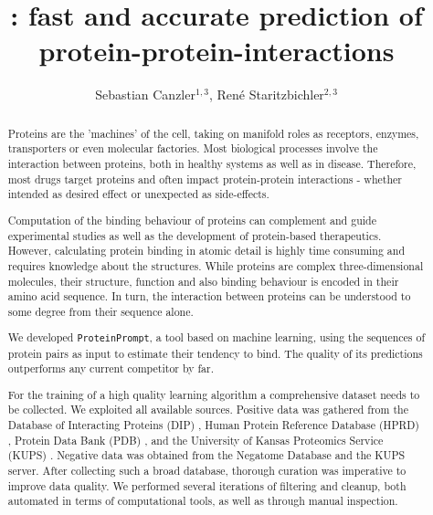 \documentclass{article}
\title{\tool: fast and accurate prediction of protein-protein-interactions}
\author{ Sebastian Canzler$^{1,3}$, Ren\'{e} Staritzbichler$^{2,3}$}
\date{}
\newcommand{\tool}{\texttt{ProteinPrompt}}
\begin{document}
\maketitle

\vspace{-1.cm}









\begin{samepage}

\begin{abstract}
  Proteins are the 'machines' of the cell, taking on manifold roles as receptors, enzymes, transporters or even molecular factories.
  Most biological processes involve the interaction between proteins, both in healthy systems as well as in disease.
  Therefore, most drugs target proteins and often impact protein-protein interactions - whether intended as desired effect or unexpected as side-effects.

  
  Computation of the binding behaviour of proteins can complement and guide experimental studies as well as the development of protein-based therapeutics.
  However, calculating protein binding in atomic detail is highly time consuming and requires  knowledge about the structures.
  While proteins are complex three-dimensional molecules, their structure, function and also binding behaviour is encoded in their amino acid sequence.
  In turn, the interaction between proteins can be understood to some degree from their sequence alone.
  
  We developed \tool, a tool based on machine learning, using the sequences of protein pairs as input to estimate their tendency to bind.
  The quality of its predictions outperforms any current competitor by far.

  
  For the training of a high quality learning algorithm a comprehensive dataset needs to be collected.
  We exploited all available sources.
  Positive data was gathered from the
  Database of Interacting Proteins (DIP)
  \cite{Salwinski:2004},
  Human Protein Reference Database (HPRD)
  \cite{Keshava_Prasad:2009},
  Protein  Data Bank (PDB) \cite{Berman:2000}, and the University of Kansas Proteomics Service (KUPS) \cite{Chen:2011}.
  Negative data was obtained from the Negatome Database \cite{Blohm:2014}  and the KUPS server.
  After collecting such a broad database, thorough curation was imperative to improve data quality.
  We performed several iterations of filtering and cleanup, both automated in terms of computational tools, as well as through manual inspection.
  

\end{abstract}
\end{samepage}
\end{document}
